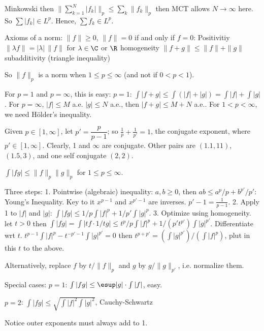 \pf Minkowski then $\| \sum_{k=1}^N |f_k|\|_p \leq \sum_k \|f_k\|_p$ then MCT allows $N \to \infty$ here. So $\sum |f_k| \in L^p$. Hence, $\sum f_k \in L^p$.




Axioms of a norm: 
$\|f\| \geq 0$, $\|f\|=0$ if and only if $f=0$: Positivitiy
$\|\lambda f\|= |\lambda| \, \|f\|$ for $\lambda \in \C$ or $\R$ homogeneity
$\|f+g\| \leq \|f\|+\|g\|$ subadditivity (triangle inequality)

So $\|f\|_p$ is a norm when $1 \leq p \leq \infty$ (and not if $0<p<1$). 

For $p=1$ and $p= \infty$, this is easy: $p=1$: $\int |f+g| \leq \int (|f|+|g|)= \int |f|+ \int |g|$. For $p=\infty$, $|f| \leq M$ a.e. $|g| \leq N$ a.e., then $|f+g| \leq M+N$ a.e.. For $1<p<\infty$, we need H\"older's inequality. 


Given $p \in [1,\infty]$, let $p' = \dfrac{p}{p-1}$; so $\frac{1}{p} + \frac{1}{p'}=1$, the conjugate exponent, where $p' \in [1,\infty]$. Clearly, 1 and $\infty$ are conjugate. Other pairs are $(1.1,11)$, $(1.5,3)$, and one self conjugate $(2,2)$. 


\begin{thm}
$\int |fg| \leq \|f\|_p \|g\|_p$ for $1 \leq p \leq \infty$. 
\end{thm}

\pf Three steps: 
1. Pointwise (algebraic) inequality: $a,b \geq 0$, then $ab \leq a^p/p + b^{p'}/p'$: Young's Inequality. Key to it $x^{p-1}$ and $x^{p'-1}$ are inverses. $p'-1 = \frac{1}{p-1}$. 
2. Apply 1 to $|f|$ and $|g|$: $\int |fg| \leq 1/p \int |f|^p + 1/p' \int |g|^p$. 
3. Optimize using homogeneity. let $t>0$ then $\int |fg|= \int |tf \cdot 1/t g| \leq t^p/p \int |f|^p + 1/(p' t^{p'}) \int |g|^{p'}$. Differentiate wrt $t$. $t^{p-1} \int |f|^p- t^{-p'-1} \int |g|^{p'} = 0$ then $t^{p+p'}= (\int |g|^{p'})/(\int |f|^p)$, plut in this $t$ to the above. 

Alternatively, replace $f$ by $t/\|f\|_p$ and $g$ by $g/\|g\|_{p'}$, i.e. normalize them. 






Special cases: $p=1$: $\int |fg| \leq \esup |g| \cdot \int |f|$, easy.

$p=2$: $\int |fg| \leq \sqrt{\int |f|^2 \int |g|^2}$, Cauchy-Schwartz

Notice outer exponents must always add to 1. 


